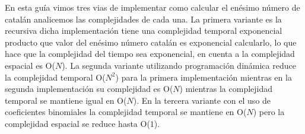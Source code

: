 En esta guía vimos tres vias de implementar como calcular el enésimo número de catalán analicemos las complejidades de cada una. La primera variante es la recursiva dicha implementación tiene una complejidad temporal exponencial producto que valor del enésimo número catalán es exponencial calcularlo, lo que hace que la complejidad del tiempo sea exponencial, en cuenta a la complejidad espacial es O($N$). La segunda variante utilizando programación dinámica reduce la complejidad temporal O($N^2$) para la primera implementación mientras en la segunda implementación su complejidad es O($N$) mientras la complejidad temporal se mantiene igual en O($N$). En la tercera variante con el uso de coeficientes binomiales la complejidad temporal se mantiene en O($N$) pero la complejidad espacial se reduce hasta O($1$).